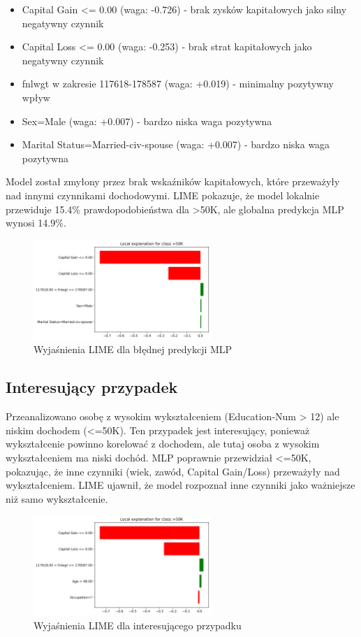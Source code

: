 \documentclass[12pt,a4paper]{article}
\begin{document}
\begin{itemize}
  \item Capital Gain <= 0.00 (waga: -0.726) - brak zysków kapitałowych jako silny negatywny czynnik
  \item Capital Loss <= 0.00 (waga: -0.253) - brak strat kapitałowych jako negatywny czynnik
  \item fnlwgt w zakresie 117618-178587 (waga: +0.019) - minimalny pozytywny wpływ
  \item Sex=Male (waga: +0.007) - bardzo niska waga pozytywna
  \item Marital Status=Married-civ-spouse (waga: +0.007) - bardzo niska waga pozytywna
\end{itemize}

Model został zmyłony przez brak wskaźników kapitałowych, które przeważyły nad innymi czynnikami dochodowymi. LIME pokazuje, że model lokalnie przewiduje 15.4\% prawdopodobieństwa dla >50K, ale globalna predykcja MLP wynosi 14.9\%.

\begin{figure}[H]
  \centering
  \includegraphics[width=0.6\textwidth]{../out/mlp-wrong.png}
  \caption{Wyjaśnienia LIME dla błędnej predykcji MLP}
\end{figure}

\subsection{Interesujący przypadek}

Przeanalizowano osobę z wysokim wykształceniem (Education-Num > 12) ale niskim dochodem (<=50K). Ten przypadek jest interesujący, ponieważ wykształcenie powinno korelować z dochodem, ale tutaj osoba z wysokim wykształceniem ma niski dochód. MLP poprawnie przewidział <=50K, pokazując, że inne czynniki (wiek, zawód, Capital Gain/Loss) przeważyły nad wykształceniem. LIME ujawnił, że model rozpoznał inne czynniki jako ważniejsze niż samo wykształcenie.

\begin{figure}[H]
  \centering
  \includegraphics[width=0.6\textwidth]{../out/mlp-interesting.png}
  \caption{Wyjaśnienia LIME dla interesującego przypadku}
\end{figure}
\end{document}
